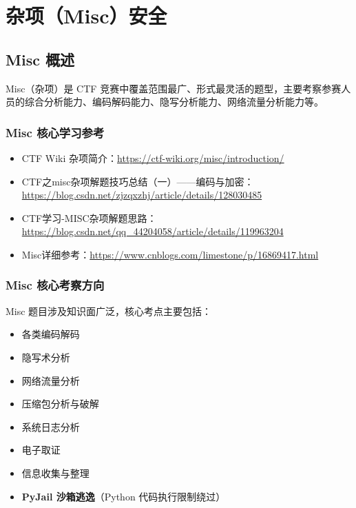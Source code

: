 \section{杂项（Misc）安全}
\label{sec:misc}

\subsection{Misc 概述}
Misc（杂项）是 CTF 竞赛中覆盖范围最广、形式最灵活的题型，主要考察参赛人员的综合分析能力、编码解码能力、隐写分析能力、网络流量分析能力等。

\subsubsection{Misc 核心学习参考}
\begin{itemize}[leftmargin=*]
    \item CTF Wiki 杂项简介：\url{https://ctf-wiki.org/misc/introduction/}
    \item CTF之misc杂项解题技巧总结（一）——编码与加密：\url{https://blog.csdn.net/zjzqxzhj/article/details/128030485}
    \item CTF学习-MISC杂项解题思路：\url{https://blog.csdn.net/qq_44204058/article/details/119963204}
    \item Misc详细参考：\url{https://www.cnblogs.com/limestone/p/16869417.html}
\end{itemize}

\subsubsection{Misc 核心考察方向}
Misc 题目涉及知识面广泛，核心考点主要包括：
\begin{itemize}[leftmargin=*]
    \item 各类编码解码
    \item 隐写术分析
    \item 网络流量分析
    \item 压缩包分析与破解
    \item 系统日志分析
    \item 电子取证
    \item 信息收集与整理
    \item \textbf{PyJail 沙箱逃逸}（Python 代码执行限制绕过）
\end{itemize}

